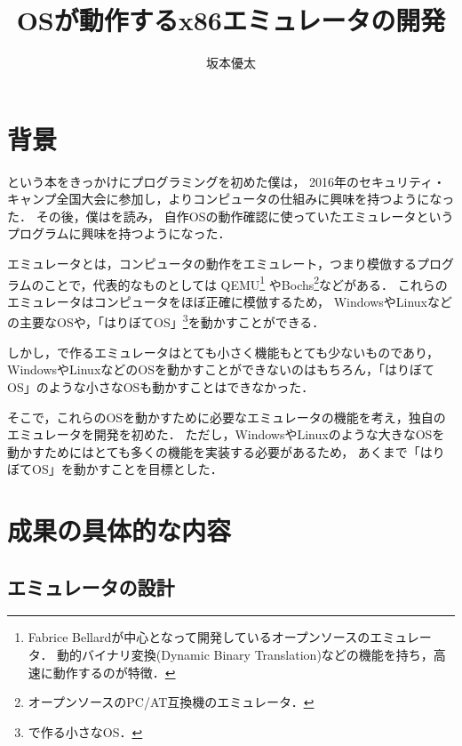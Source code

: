 \documentclass[10pt,a4j]{jsarticle}
\title{\vspace{-1.7cm}OSが動作するx86エミュレータの開発}
\author{坂本優太}
\date{}
\begin{document}
\maketitle

\section{背景}
\cite[30日でできる！ OS自作入門]{30days-osdev}という本をきっかけにプログラミングを初めた僕は，
2016年のセキュリティ・キャンプ全国大会に参加し，よりコンピュータの仕組みに興味を持つようになった．
その後，僕は\cite[自作エミュレータで学ぶx86アーキテクチャ]{learn-x86-by-emu}を読み，
自作OSの動作確認に使っていたエミュレータというプログラムに興味を持つようになった．

エミュレータとは，コンピュータの動作をエミュレート，つまり模倣するプログラムのことで，代表的なものとしては
QEMU\footnote{Fabrice Bellardが中心となって開発しているオープンソースのエミュレータ．
動的バイナリ変換(Dynamic Binary Translation)などの機能を持ち，高速に動作するのが特徴．}
やBochs\footnote{オープンソースのPC/AT互換機のエミュレータ．}などがある．
これらのエミュレータはコンピュータをほぼ正確に模倣するため，
WindowsやLinuxなどの主要なOSや，「はりぼてOS」\footnote{\cite{30days-osdev}で作る小さなOS．}を動かすことができる．

しかし，\cite{learn-x86-by-emu}で作るエミュレータはとても小さく機能もとても少ないものであり，
WindowsやLinuxなどのOSを動かすことができないのはもちろん，「はりぼてOS」のような小さなOSも動かすことはできなかった．

そこで，これらのOSを動かすために必要なエミュレータの機能を考え，独自のエミュレータを開発を初めた．
ただし，WindowsやLinuxのような大きなOSを動かすためにはとても多くの機能を実装する必要があるため，
あくまで「はりぼてOS」を動かすことを目標とした．

\section{成果の具体的な内容}

\subsection{エミュレータの設計}
\end{document}
